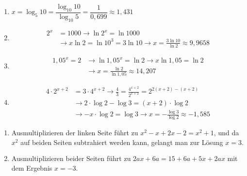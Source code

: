 \begin{enumerate}[label=\alph*)]
  \item $x = \log_5 10 = \dfrac{\log_{10} 10}{\log_{10} 5} = \dfrac{1}{0{,}699} \approx 1{,}431$
  \item \begin{align*}
      2^x &= 1000 \rightarrow \ln 2^x = \ln 1000\\
      &\rightarrow x \ln 2 = \ln 10^3 = 3\ln 10 \rightarrow x = \frac{3\ln 10}{\ln 2} \approx 9{,}9658
    \end{align*}
  \item \begin{align*}
      1{,}05^x = 2 &\rightarrow \ln 1{,}05^x = \ln 2 \rightarrow x \ln 1{,}05 = \ln 2\\
      &\rightarrow x = \frac{\ln 2}{\ln 1{,}05} \approx 14{,}207
    \end{align*}
  \item \begin{align*}
      4 \cdot 2^{x+2} &= 3 \cdot 4^{x+2} \rightarrow \frac{4}{3} = \frac{4^{x+2}}{2^{x+2}} = 2^{2(x+2) - (x+2)}\\
      &\rightarrow 2 \cdot \log 2 - \log 3 = (x+2) \cdot \log 2\\
      &\rightarrow -x \cdot \log 2 = \log 3 \rightarrow x = -\frac{\log 3}{\log 2} \approx -1{,}585
    \end{align*}
\end{enumerate}

\begin{enumerate}[label=\alph*)]
  \item Ausmultiplizieren der linken Seite führt zu $x^2 - x + 2x - 2 = x^2 + 1$, und da $x^2$ auf beiden Seiten subtrahiert werden kann, gelangt man zur Lösung $x = 3$.
  \item Ausmultiplizieren beider Seiten führt zu $2ax + 6a = 15 + 6a + 5x + 2ax$ mit dem Ergebnis $x = -3$.
\end{enumerate}

